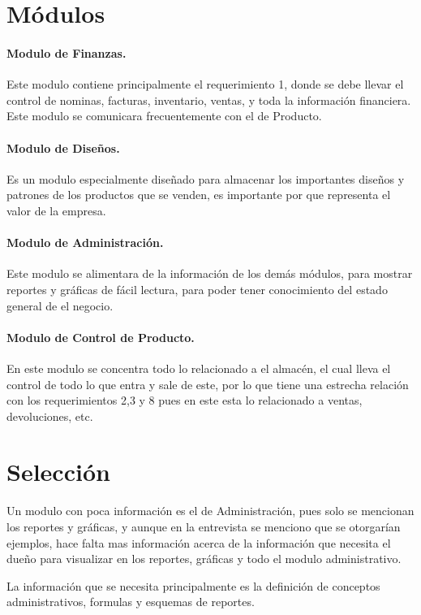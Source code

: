 \documentclass[spanish,12pt,letterpapper]{article}
\begin{document}
	\section{Módulos}
	\paragraph{Modulo de Finanzas.} Este modulo contiene principalmente el requerimiento 1, donde se debe llevar el control de nominas, facturas, inventario, ventas, y toda la información financiera. Este modulo se comunicara frecuentemente con el de Producto.
	\paragraph{Modulo de Diseños.} Es un modulo especialmente diseñado para almacenar los importantes diseños y patrones de los productos que se venden, es importante por que representa el valor de la empresa.
	\paragraph{Modulo de Administración.} Este modulo se alimentara de la información de los demás módulos, para mostrar reportes y gráficas de fácil lectura, para poder tener conocimiento del estado general de el negocio.
	\paragraph{Modulo de Control de Producto.} En este modulo se concentra todo lo relacionado a el almacén, el cual lleva el control de todo lo que entra y sale de este, por lo que tiene una estrecha relación con los requerimientos 2,3 y 8 pues en este esta lo relacionado a ventas, devoluciones, etc.
	
	\section{Selección}
	Un modulo con poca información es el de Administración, pues solo se mencionan los reportes y gráficas, y aunque en la entrevista se menciono que se otorgarían ejemplos, hace falta mas información acerca de la información que necesita el dueño para visualizar en los reportes, gráficas y todo el modulo administrativo.
	
	La información que se necesita principalmente es la definición de conceptos administrativos, formulas y esquemas de reportes.
	
\end{document}
